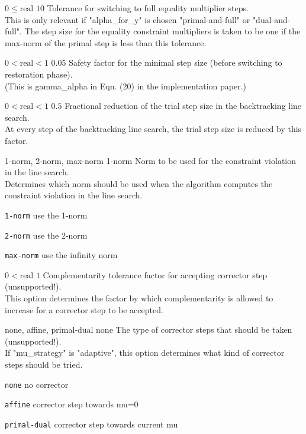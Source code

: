 %
{$0\leq\textrm{real}$}%
{$10$}%
{Tolerance for switching to full equality multiplier steps.\\
This is only relevant if "alpha\_for\_y" is chosen "primal-and-full" or "dual-and-full".  The step size for the equality constraint multipliers is taken to be one if the max-norm of the primal step is less than this tolerance.}%
{}

%
{$0<\textrm{real}<1$}%
{$0.05$}%
{Safety factor for the minimal step size (before switching to restoration phase).\\
(This is gamma\_alpha in Eqn. (20) in the implementation paper.)}%
{}

%
{$0<\textrm{real}<1$}%
{$0.5$}%
{Fractional reduction of the trial step size in the backtracking line search.\\
At every step of the backtracking line search, the trial step size is reduced by this factor.}%
{}

%
{1-norm, 2-norm, max-norm}%
{1-norm}%
{Norm to be used for the constraint violation in the line search.\\
Determines which norm should be used when the algorithm computes the constraint violation in the line search.}%
{\begin{list}{}{
\setlength{\parsep}{0em}
\setlength{\leftmargin}{5ex}
\setlength{\labelwidth}{2ex}
\setlength{\itemindent}{0ex}
\setlength{\topsep}{0pt}}
\item[\texttt{1-norm}] use the 1-norm
\item[\texttt{2-norm}] use the 2-norm
\item[\texttt{max-norm}] use the infinity norm
\end{list}
}

%
{$0<\textrm{real}$}%
{$1$}%
{Complementarity tolerance factor for accepting corrector step (unsupported!).\\
This option determines the factor by which complementarity is allowed to increase for a corrector step to be accepted.}%
{}

%
{none, affine, primal-dual}%
{none}%
{The type of corrector steps that should be taken (unsupported!).\\
If "mu\_strategy" is "adaptive", this option determines what kind of corrector steps should be tried.}%
{\begin{list}{}{
\setlength{\parsep}{0em}
\setlength{\leftmargin}{5ex}
\setlength{\labelwidth}{2ex}
\setlength{\itemindent}{0ex}
\setlength{\topsep}{0pt}}
\item[\texttt{none}] no corrector
\item[\texttt{affine}] corrector step towards mu=0
\item[\texttt{primal-dual}] corrector step towards current mu
\end{list}
}

